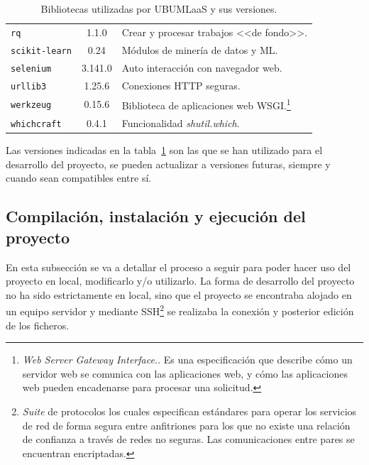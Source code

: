 \begin{table}[p]
\begin{tabular}{lcl}
	\texttt{rq} & 1.1.0 & Crear y procesar trabajos <<de fondo>>.\\ \rowcolor[HTML]{EFEFEF}
	\texttt{scikit-learn} & 0.24 & Módulos de minería de datos y ML.\\ 
	\texttt{selenium} & 3.141.0 & Auto interacción con navegador web.\\ \rowcolor[HTML]{EFEFEF}
	\texttt{urllib3} & 1.25.6 & Conexiones HTTP seguras.\\
	\texttt{werkzeug} & 0.15.6 & Biblioteca de aplicaciones web WSGI.\footnote{\textit{Web Server Gateway Interface.}. Es una especificación que describe cómo un servidor web se comunica con las aplicaciones web, y cómo las aplicaciones web pueden encadenarse para procesar una solicitud.}\\ \rowcolor[HTML]{EFEFEF}
	\texttt{whichcraft} & 0.4.1 & Funcionalidad \textit{shutil.which}. \\
	\bottomrule
\end{tabular}
\caption{Bibliotecas utilizadas por UBUMLaaS y sus versiones.}\label{tab:bibliotecas-python-ubumlaas}
\end{table}

Las versiones indicadas en la tabla~\ref{tab:bibliotecas-python-ubumlaas} son las que se han utilizado para el desarrollo del proyecto, se pueden actualizar a versiones futuras, siempre y cuando sean compatibles entre sí.

\subsection{Compilación, instalación y ejecución del proyecto}
En esta subsección se va a detallar el proceso a seguir para poder hacer uso del proyecto en local, modificarlo y/o utilizarlo. La forma de desarrollo del proyecto no ha sido estrictamente en local, sino que el proyecto se encontraba alojado en un equipo servidor y mediante SSH\footnote{\textit{Suite} de protocolos los cuales especifican estándares para operar los servicios de red de forma segura entre anfitriones para los que no existe una relación de confianza a través de redes no seguras. Las comunicaciones entre pares se encuentran encriptadas.} se realizaba la conexión y posterior edición de los ficheros.

